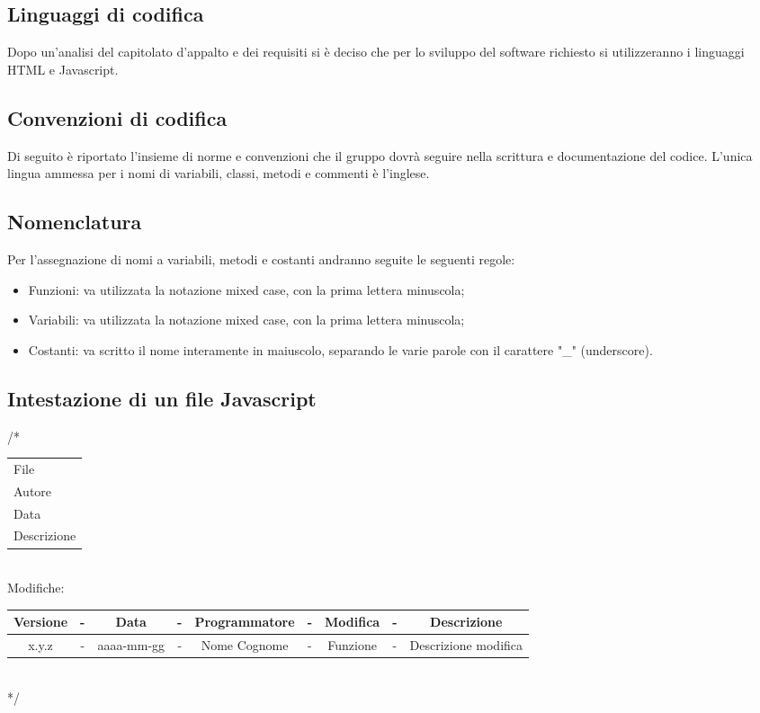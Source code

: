 \subsection{Linguaggi di codifica}
Dopo un'analisi del capitolato d'appalto e dei requisiti si è deciso che per lo sviluppo del software richiesto si utilizzeranno i linguaggi HTML e Javascript.

\subsection{Convenzioni di codifica}
Di seguito è riportato l'insieme di norme e convenzioni che il gruppo dovrà seguire nella scrittura e documentazione del codice.
L'unica lingua ammessa per i nomi di variabili, classi, metodi e commenti è l'inglese.

\subsection{Nomenclatura}
Per l'assegnazione di nomi a variabili, metodi e costanti andranno seguite le seguenti regole:
\begin{itemize}
	\item Funzioni: va utilizzata la notazione mixed case, con la prima lettera minuscola;
	\item Variabili: va utilizzata la notazione mixed case, con la prima lettera minuscola;
	\item Costanti: va scritto il nome interamente in maiuscolo, separando le varie parole con il carattere "\_" (underscore).
\end{itemize}

\subsection{Intestazione di un file Javascript}

\begin{flushleft}

/*\\
\vspace{3mm}
\begin{tabular}{l}
	File\\
	Autore\\
	Data\\
	Descrizione\\
\end{tabular}\\
\vspace{5mm}
 Modifiche:\\
 \vspace{3mm}
\begin{tabular}{| c c c c c c c c c |}
	\hline
	Versione & - & Data & - & Programmatore & - & Modifica & - & Descrizione\\
	\hline
	x.y.z & - & aaaa-mm-gg & - & Nome Cognome & - & Funzione & - & Descrizione modifica\\
	\hline
\end{tabular}\\
\vspace{3mm}
*/\\

\end{flushleft}

